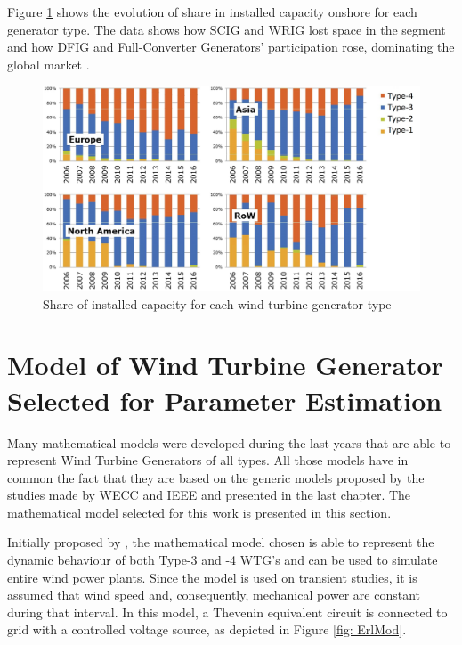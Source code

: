 Figure \ref{fig: WindShare} shows the evolution of share in installed capacity onshore for each generator type. The data shows how SCIG and WRIG lost space in the segment and how DFIG and Full-Converter Generators' participation rose, dominating the global market \cite{Magagna2017}.

\begin{figure}[h]
	\caption{Share of installed capacity for each wind turbine generator type}
	\begin{center}
		\includegraphics[scale=.2]{Images/WTGTypes.jpg}
	\end{center}
	\label{fig: WindShare}
\end{figure}

\section{Model of Wind Turbine Generator Selected for Parameter Estimation}

Many mathematical models were developed during the last years that are able to represent Wind Turbine Generators of all types. All those models have in common the fact that they are based on the generic models proposed by the studies made by WECC and IEEE and presented in the last chapter. The mathematical model selected for this work is presented in this section.

Initially proposed by \cite{Erlich2012}, the mathematical model chosen is able to represent the dynamic behaviour of both Type-3 and -4 WTG's and can be used to simulate entire wind power plants. Since the model is used on transient studies, it is assumed that wind speed and, consequently, mechanical power are constant during that interval. In this model, a Thevenin equivalent circuit is connected to grid with a controlled voltage source, as depicted in Figure \ref{fig: ErlMod}.

